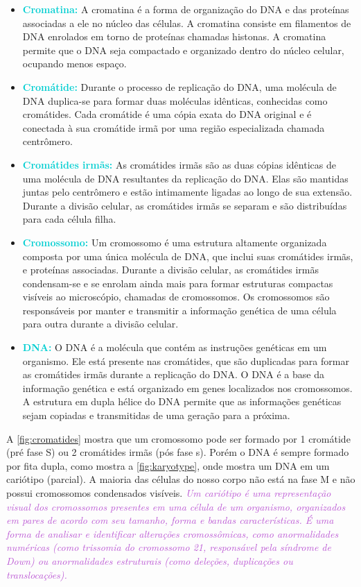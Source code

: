 \documentclass[11pt,a4paper]{article}
\begin{document}
    \begin{itemize}
		\item \textcolor{DarkTurquoise}{\textbf{Cromatina: }} A cromatina é a forma de organização do DNA e das proteínas associadas a ele no núcleo das células. A cromatina consiste em filamentos de DNA enrolados em torno de proteínas chamadas histonas. A cromatina permite que o DNA seja compactado e organizado dentro do núcleo celular, ocupando menos espaço.
		\item \textcolor{DarkTurquoise}{\textbf{Cromátide: }} Durante o processo de replicação do DNA, uma molécula de DNA duplica-se para formar duas moléculas idênticas, conhecidas como cromátides. Cada cromátide é uma cópia exata do DNA original e é conectada à sua cromátide irmã por uma região especializada chamada centrômero.
		\item \textcolor{DarkTurquoise}{\textbf{Cromátides irmãs:}} As cromátides irmãs são as duas cópias idênticas de uma molécula de DNA resultantes da replicação do DNA. Elas são mantidas juntas pelo centrômero e estão intimamente ligadas ao longo de sua extensão. Durante a divisão celular, as cromátides irmãs se separam e são distribuídas para cada célula filha.
		\item \textcolor{DarkTurquoise}{\textbf{Cromossomo:}} Um cromossomo é uma estrutura altamente organizada composta por uma única molécula de DNA, que inclui suas cromátides irmãs, e proteínas associadas. Durante a divisão celular, as cromátides irmãs condensam-se e se enrolam ainda mais para formar estruturas compactas visíveis ao microscópio, chamadas de cromossomos. Os cromossomos são responsáveis por manter e transmitir a informação genética de uma célula para outra durante a divisão celular.
		\item \textcolor{DarkTurquoise}{\textbf{DNA:}} O DNA é a molécula que contém as instruções genéticas em um organismo. Ele está presente nas cromátides, que são duplicadas para formar as cromátides irmãs durante a replicação do DNA. O DNA é a base da informação genética e está organizado em genes localizados nos cromossomos. A estrutura em dupla hélice do DNA permite que as informações genéticas sejam copiadas e transmitidas de uma geração para a próxima.
	\end{itemize}

		
		A \ref{fig:cromatides} mostra que um cromossomo pode ser formado por 1 cromátide (pré fase S) ou 2 cromátides irmãs (pós fase s). Porém o DNA é sempre formado por fita dupla, como mostra a \ref{fig:karyotype}, onde mostra um DNA em um cariótipo (parcial). A maioria das células do nosso corpo não está na fase M e não possui cromossomos condensados visíveis. \textit{\textcolor{MediumOrchid}{Um cariótipo é uma representação visual dos cromossomos presentes em uma célula de um organismo, organizados em pares de acordo com seu tamanho, forma e bandas características. É uma forma de analisar e identificar alterações cromossômicas, como anormalidades numéricas (como trissomia do cromossomo 21, responsável pela síndrome de Down) ou anormalidades estruturais (como deleções, duplicações ou translocações).}} 
    
\end{document}
